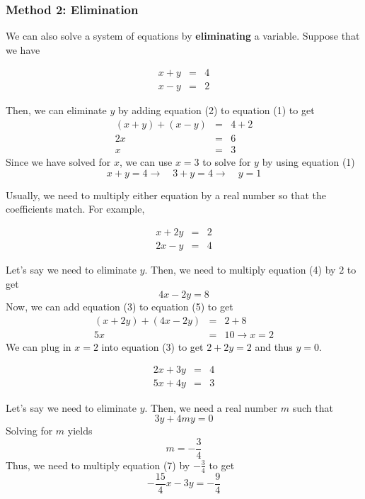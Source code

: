 \begin{frame}[t]
\frametitle{Method 2: Elimination}
We can also solve a system of equations by \textbf{eliminating} a variable. Suppose that we have
\begin{ex}
\begin{eqnarray}
x+y &=& 4\\
x-y &=& 2
\end{eqnarray}
\end{ex}
\begin{sol}
Then, we can eliminate $y$ by adding equation (2) to equation (1) to get
\begin{eqnarray*}
(x+y) + (x-y) &=& 4 + 2\\
2x &=& 6 \\
x &=& 3
\end{eqnarray*}
Since we have solved for $x$, we can use $x=3$ to solve for $y$ by using equation (1)
\[x +y=4 \rightarrow \quad 3+y = 4  \rightarrow \quad y = 1\]
\end{sol}
\end{frame}


\begin{frame}[t]
Usually, we need to multiply either equation by a real number so that the coefficients match. For example, 
\begin{ex}
\begin{eqnarray}
x+2y &=& 2\\
2x-y &=& 4
\end{eqnarray}
\end{ex}
\begin{sol}
Let's say we need to eliminate $y$. Then, we need to multiply equation (4) by $2$ to get
\begin{equation}
4x - 2y = 8
\end{equation} 
Now, we can add equation (3) to equation (5) to get
\begin{eqnarray*}
(x+2y) + (4x-2y) &=& 2 + 8\\
5x &=& 10 \rightarrow x = 2
\end{eqnarray*}
We can plug in $x=2$ into equation (3) to get $2 + 2y = 2$ and thus $y = 0$.
\end{sol}
\end{frame}


\begin{frame}[t]
\begin{ex}
\begin{eqnarray}
2x+3y &=& 4\\
5x+4y &=& 3
\end{eqnarray}
\end{ex}
\begin{sol}
Let's say we need to eliminate $y$. Then, we need a real number $m$ such that
\[ 3y + 4my = 0\]
Solving for $m$ yields 
\[ m = -\frac{3}{4}\]
Thus, we need to multiply equation (7) by $-\frac{3}{4}$ to get
\begin{equation}
-\frac{15}{4}x - 3y = -\frac{9}{4}
\end{equation} 
\end{sol}
\end{frame}

